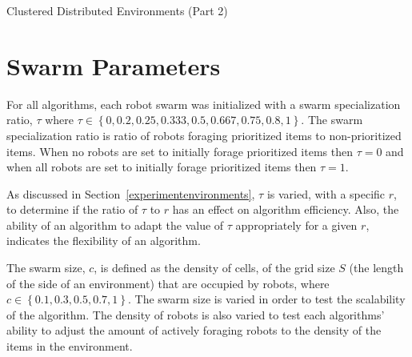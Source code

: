 \begin{algorithm}

\caption{Clustered Distributed Environments (Part 2)}
\label{algorithm:clustered2}
\begin{algorithmic}[1]
	  \State {}
	  \State {}
	  \State {}
	
		  \State {}
		  \State {}
		  \State {}
				
        	\State {}
        	\State {}
				  \State {}
				  \State {}	
			  \EndIf
		  \EndWhile
		\EndIf
	\EndWhile
\EndFunction
\end{algorithmic}
\end{algorithm}


\section{Swarm Parameters}
\label{swarmparameters}

For all algorithms, each robot swarm was initialized with 
a swarm specialization ratio, $\tau$ where $\tau\in\left\{0, 0.2, 0.25, 0.333, 0.5, 0.667, 0.75, 0.8,1\right\}$. The swarm specialization ratio is ratio of robots foraging prioritized items to non-prioritized items. When no robots are set to initially forage prioritized items then $\tau=0$ and when all robots are set to initially forage prioritized items then $\tau=1$.

As discussed in Section~\ref{experimentenvironments}, $\tau$ is varied, with a specific $r$, to determine if the ratio of $\tau$ to $r$ has an effect on algorithm efficiency. Also, the ability of an algorithm to adapt the value of $\tau$ appropriately for a given $r$, indicates the flexibility of an algorithm. %

The swarm size, $c$, is defined as the density of cells, of the grid size $S$ (the length of the side of an environment) that are occupied by robots, where $c\in\left\{0.1, 0.3, 0.5, 0.7, 1\right\}$. The swarm size is varied in order to test the scalability of the algorithm. The density of robots is also varied to test each algorithms' ability to adjust the amount of actively  foraging robots to the density of the items in the environment.

